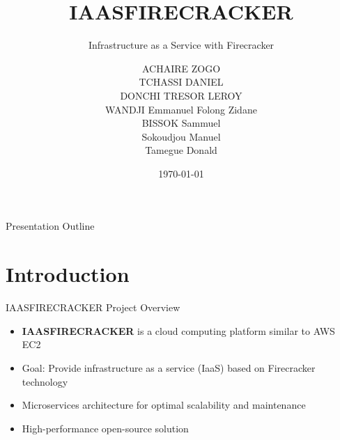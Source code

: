 \documentclass{beamer}
\title{IAASFIRECRACKER}
\subtitle{Infrastructure as a Service with Firecracker}
\author{\begin{columns}[T]
  \column{0.5\textwidth}
  ACHAIRE ZOGO \\
  TCHASSI DANIEL \\
  DONCHI TRESOR LEROY \\
  WANDJI Emmanuel
  \column{0.5\textwidth}
  Folong Zidane \\
  BISSOK Sammuel \\
  Sokoudjou Manuel \\
  Tamegue Donald
\end{columns}}
\date{\today}
\institute{UE-PROJET}
\begin{document}
\begin{frame}
  \titlepage
\end{frame}

\begin{frame}{Presentation Outline}
  \tableofcontents
\end{frame}

\section{Introduction}

\begin{frame}{IAASFIRECRACKER Project Overview}
  \begin{itemize}
    \item \textbf{IAASFIRECRACKER} is a cloud computing platform similar to AWS EC2
    \item Goal: Provide infrastructure as a service (IaaS) based on Firecracker technology
    \item Microservices architecture for optimal scalability and maintenance
    \item High-performance open-source solution
  \end{itemize}
\end{frame}
\end{document}
